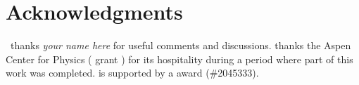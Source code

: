 \documentclass[12pt, oneside]{report}    %
\begin{document}
\section*{Acknowledgments}

\ thanks 
\emph{your name here}
for useful comments and discussions. 
%
 thanks 
    the Aspen Center for Physics ( grant )
    for 
    its 
    hospitality during a period where part of this work was completed. 
%
 is supported by a  award (\#2045333).



% 
\end{document}

